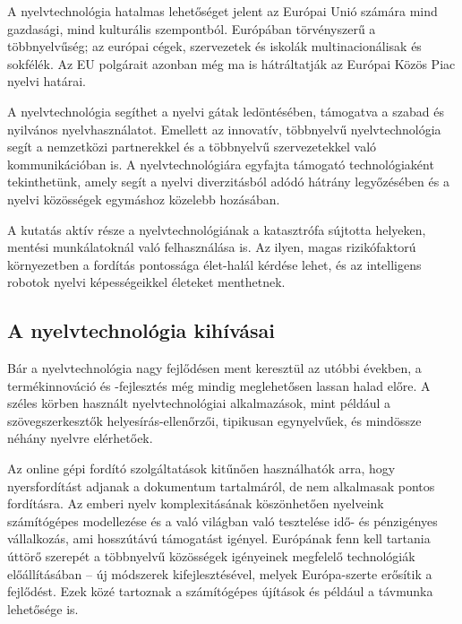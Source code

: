 \begin{multicols}{2}
A nyelvtechnológia hatalmas lehetőséget jelent az Európai Unió számára mind gazdasági, mind kulturális szempontból. Európában törvényszerű a többnyelvűség; az európai cégek, szervezetek és iskolák multinacionálisak és sokfélék. Az EU polgárait azonban még ma is hátráltatják az Európai Közös Piac nyelvi határai.


A nyelvtechnológia segíthet a nyelvi gátak ledöntésében, támogatva a szabad és nyilvános nyelvhasználatot. Emellett az innovatív, többnyelvű nyelvtechnológia segít a nemzetközi partnerekkel és a többnyelvű szervezetekkel való kommunikációban is. A nyelvtechnológiára egyfajta támogató technológiaként tekinthetünk, amely segít a nyelvi diverzitásból adódó hátrány legyőzésében és a nyelvi kö\-zös\-sé\-gek egymáshoz közelebb hozásában.

A kutatás aktív része a nyelvtechnológiának a katasztrófa sújtotta helyeken, mentési munkálatoknál való felhasználása is. Az ilyen, magas rizikófaktorú kör\-nye\-zet\-ben a fordítás pontossága élet-halál kérdése lehet, és az intelligens robotok nyelvi képességeikkel életeket menthetnek. 

\subsection{A nyelvtechnológia kihívásai}

Bár a nyelvtechnológia nagy fejlődésen ment keresztül az utóbbi években, a termékinnováció és -fejlesztés még mindig meglehetősen lassan halad előre. A széles körben használt nyelvtechnológiai al\-kal\-ma\-zá\-sok, mint például a szö\-veg\-szer\-kesz\-tők helyesírás-ellenőrzői, tipikusan egynyelvűek, és mindössze néhány nyelvre elérhetőek.


Az online gépi fordító szolgáltatások kitűnően használhatók arra, hogy nyersfordítást adjanak a dokumentum tartalmáról, de nem alkalmasak pontos fordításra. Az emberi nyelv komplexitásának köszönhetően nyelveink számítógépes modellezése és a való világban való tesz\-te\-lé\-se idő- és pénzigényes vállalkozás, ami hosszú\-tá\-vú támogatást igényel. Európának fenn kell tartania úttörő sze\-re\-pét a többnyelvű közösségek igényeinek megfelelő technológiák előállításában -- új módszerek kifejlesztésével, melyek Európa-szerte erősítik a fejlődést. Ezek közé tartoznak a számítógépes újítások és például a távmunka lehetősége is.


\end{multicols}
